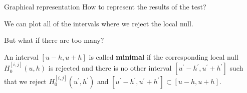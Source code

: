 \documentclass[10pt, handout]{beamer}
\begin{document}
\begin{frame}{Graphical representation}
How to represent the results of the test? \pause

We can plot all of the intervals where we reject the local null. \pause

But what if there are too many?\pause

An interval $[u-h, u+h]$ is called \textbf{minimal} if the corresponding local null $H_0^{[i,j]}(u,h)$ is rejected and there is no other interval $[u^\prime-h^\prime, u^\prime+h^\prime]$ such that we reject $H_0^{[i,j]}(u^\prime,h^\prime)$ and $[u^\prime-h^\prime, u^\prime+h^\prime] \subset [u-h, u+h]$.

\end{frame}
\end{document}
